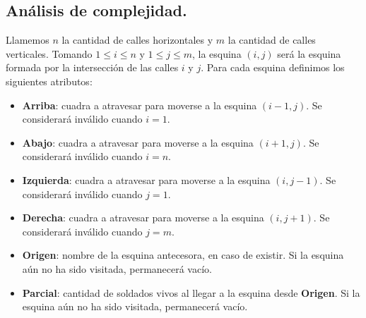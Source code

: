 
\subsection{Análisis de complejidad.}

\vspace*{0.3cm}

Llamemos $n$ la cantidad de calles horizontales y $m$ la cantidad de calles verticales.  Tomando $1 \leq i \leq n$ y $1 \leq j \leq m$, la esquina $(i,j)$ será la esquina formada por la intersección de las calles $i$ y $j$.  Para cada esquina definimos los siguientes atributos:

\begin{itemize}
	\item {\bf Arriba}: cuadra a atravesar para moverse a la esquina $(i-1,j)$. Se considerará inválido cuando $i = 1$.
	\item {\bf Abajo}: cuadra a atravesar para moverse a la esquina $(i+1,j)$. Se considerará inválido cuando $i = n$.
	\item {\bf Izquierda}: cuadra a atravesar para moverse a la esquina $(i,j-1)$. Se considerará inválido cuando $j = 1$.
	\item {\bf Derecha}: cuadra a atravesar para moverse a la esquina $(i,j+1)$. Se considerará inválido cuando $j = m$.
	\item {\bf Origen}: nombre de la esquina antecesora, en caso de existir.  Si la esquina aún no ha sido visitada, permanecerá vacío.
	\item {\bf Parcial}: cantidad de soldados vivos al llegar a la esquina desde {\bf Origen}. Si la esquina aún no ha sido visitada, permanecerá vacío.
\end{itemize}

